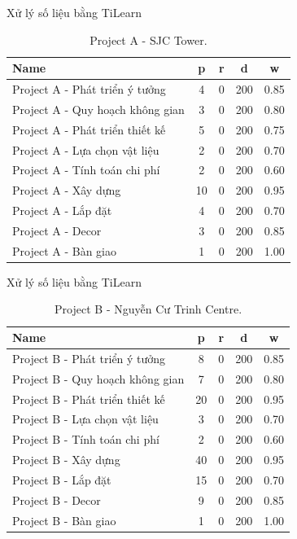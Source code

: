 \documentclass[10pt]{beamer}
\begin{document}
\begin{frame}{Xử lý số liệu bằng TiLearn}
    \begin{table}[ht]
        \centering
        \begin{tabular}{|l|c|c|c|c|}
        \hline
        \textbf{Name} & \textbf{p} & \textbf{r} & \textbf{d} & \textbf{w} \\
        \hline
        Project A - Phát triển ý tưởng    & 4  & 0  & 200 & 0.85 \\
        Project A - Quy hoạch không gian  & 3  & 0  & 200 & 0.80 \\
        Project A - Phát triển thiết kế   & 5  & 0  & 200 & 0.75 \\
        Project A - Lựa chọn vật liệu     & 2  & 0  & 200 & 0.70 \\
        Project A - Tính toán chi phí     & 2  & 0  & 200 & 0.60 \\
        Project A - Xây dựng              & 10 & 0  & 200 & 0.95 \\
        Project A - Lắp đặt               & 4  & 0  & 200 & 0.70 \\
        Project A - Decor                 & 3  & 0  & 200 & 0.85 \\
        Project A - Bàn giao              & 1  & 0  & 200 & 1.00 \\
        \hline
        \end{tabular}
        \caption{Project A - SJC Tower.}
        \end{table}
\end{frame}


\begin{frame}{Xử lý số liệu bằng TiLearn}
    \begin{table}[ht]
        \centering
        \begin{tabular}{|l|c|c|c|c|}
        \hline
        \textbf{Name} & \textbf{p} & \textbf{r} & \textbf{d} & \textbf{w} \\
        \hline
        Project B - Phát triển ý tưởng    & 8  & 0  & 200 & 0.85 \\
        Project B - Quy hoạch không gian  & 7  & 0  & 200 & 0.80 \\
        Project B - Phát triển thiết kế   & 20 & 0  & 200 & 0.95 \\
        Project B - Lựa chọn vật liệu     & 3  & 0  & 200 & 0.70 \\
        Project B - Tính toán chi phí     & 2  & 0  & 200 & 0.60 \\
        Project B - Xây dựng              & 40 & 0  & 200 & 0.95 \\
        Project B - Lắp đặt               & 15 & 0  & 200 & 0.70 \\
        Project B - Decor                 & 9  & 0  & 200 & 0.85 \\
        Project B - Bàn giao              & 1  & 0  & 200 & 1.00 \\
        \hline
        \end{tabular}
        \caption{Project B - Nguyễn Cư Trinh Centre.}
        \end{table}
\end{frame}
\end{document}
